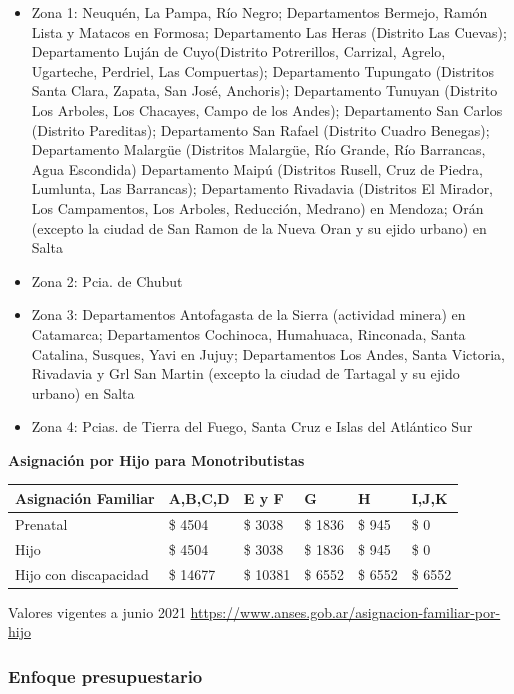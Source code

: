 \documentclass[
  12,
]{article}
\begin{document}
\begin{itemize}
\item
  Zona 1: Neuquén, La Pampa, Río Negro; Departamentos Bermejo, Ramón
  Lista y Matacos en Formosa; Departamento Las Heras (Distrito Las
  Cuevas); Departamento Luján de Cuyo(Distrito Potrerillos, Carrizal,
  Agrelo, Ugarteche, Perdriel, Las Compuertas); Departamento Tupungato
  (Distritos Santa Clara, Zapata, San José, Anchoris); Departamento
  Tunuyan (Distrito Los Arboles, Los Chacayes, Campo de los Andes);
  Departamento San Carlos (Distrito Pareditas); Departamento San Rafael
  (Distrito Cuadro Benegas); Departamento Malargüe (Distritos Malargüe,
  Río Grande, Río Barrancas, Agua Escondida) Departamento Maipú
  (Distritos Rusell, Cruz de Piedra, Lumlunta, Las Barrancas);
  Departamento Rivadavia (Distritos El Mirador, Los Campamentos, Los
  Arboles, Reducción, Medrano) en Mendoza; Orán (excepto la ciudad de
  San Ramon de la Nueva Oran y su ejido urbano) en Salta
\item
  Zona 2: Pcia. de Chubut
\item
  Zona 3: Departamentos Antofagasta de la Sierra (actividad minera) en
  Catamarca; Departamentos Cochinoca, Humahuaca, Rinconada, Santa
  Catalina, Susques, Yavi en Jujuy; Departamentos Los Andes, Santa
  Victoria, Rivadavia y Grl San Martin (excepto la ciudad de Tartagal y
  su ejido urbano) en Salta
\item
  Zona 4: Pcias. de Tierra del Fuego, Santa Cruz e Islas del Atlántico
  Sur
\end{itemize}

\textbf{Asignación por Hijo para Monotributistas}

\begin{longtable}[]{@{}llllll@{}}
\toprule
Asignación Familiar & A,B,C,D & E y F & G & H & I,J,K\tabularnewline
\midrule
\endhead
Prenatal & \$ 4504 & \$ 3038 & \$ 1836 & \$ 945 & \$ 0\tabularnewline
Hijo & \$ 4504 & \$ 3038 & \$ 1836 & \$ 945 & \$ 0\tabularnewline
Hijo con discapacidad & \$ 14677 & \$ 10381 & \$ 6552 & \$ 6552 & \$
6552\tabularnewline
\bottomrule
\end{longtable}

Valores vigentes a junio 2021
\url{https://www.anses.gob.ar/asignacion-familiar-por-hijo}

\hypertarget{enfoque-presupuestario}{%
\subsubsection{Enfoque presupuestario}\label{enfoque-presupuestario}}
\end{document}
